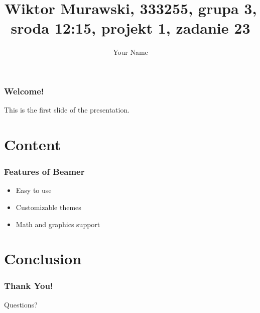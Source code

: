 \documentclass{beamer}
\title{Wiktor Murawski, 333255, grupa 3, sroda 12:15, projekt 1, zadanie 23}
\author{Your Name}
\date{}
\begin{document}
	
	\frame{\titlepage}
	
	\section{}
	\begin{frame}
		\frametitle{Welcome!}
		This is the first slide of the presentation.
	\end{frame}
	
	
	\section{Content}
	\begin{frame}
		\frametitle{Features of Beamer}
		\begin{itemize}
			\item Easy to use
			\item Customizable themes
			\item Math and graphics support
		\end{itemize}
	\end{frame}
	
	\section{Conclusion}
	\begin{frame}
		\frametitle{Thank You!}
		Questions?
	\end{frame}
	
\end{document}
